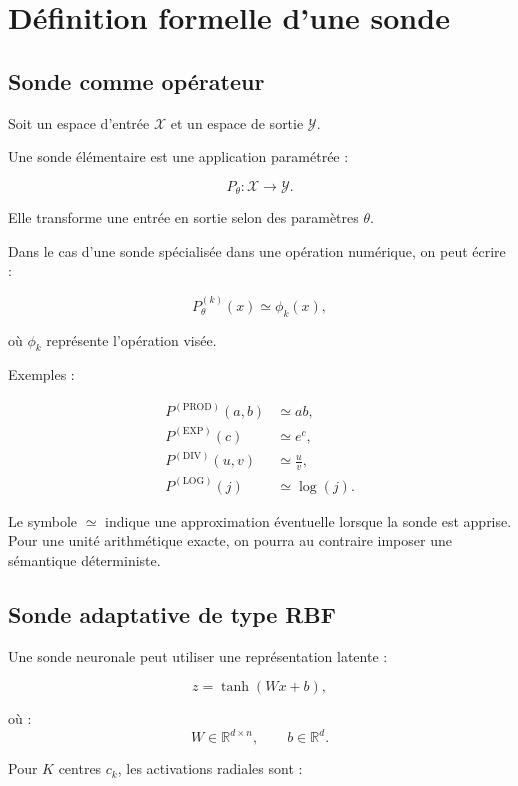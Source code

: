 \documentclass[11pt,a4paper]{article}
\begin{document}
\section{Définition formelle d'une sonde}

\subsection{Sonde comme opérateur}

Soit un espace d'entrée $\mathcal{X}$ et un espace de sortie
$\mathcal{Y}$.

Une sonde élémentaire est une application paramétrée :

\[
P_{\theta} :
\mathcal{X}
\rightarrow
\mathcal{Y}.
\]

Elle transforme une entrée en sortie selon des paramètres
$\theta$.

Dans le cas d'une sonde spécialisée dans une opération numérique,
on peut écrire :

\[
P_{\theta}^{(k)}(x)
\simeq
\phi_k(x),
\]

où $\phi_k$ représente l'opération visée.

Exemples :

\[
\begin{aligned}
P^{(\mathrm{PROD})}(a,b) &\simeq ab,\\
P^{(\mathrm{EXP})}(c) &\simeq e^c,\\
P^{(\mathrm{DIV})}(u,v) &\simeq \frac{u}{v},\\
P^{(\mathrm{LOG})}(j) &\simeq \log(j).
\end{aligned}
\]

Le symbole $\simeq$ indique une approximation éventuelle lorsque
la sonde est apprise. Pour une unité arithmétique exacte, on pourra
au contraire imposer une sémantique déterministe.

\subsection{Sonde adaptative de type RBF}

Une sonde neuronale peut utiliser une représentation latente :

\[
z = \tanh(Wx+b),
\]

où :
\[
W\in\mathbb{R}^{d\times n},
\qquad
b\in\mathbb{R}^{d}.
\]

Pour $K$ centres $c_k$, les activations radiales sont :
\end{document}
